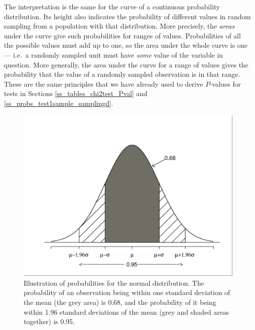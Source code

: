 The interpretation is the same for the curve of a continuous probability
distribution. Its height also indicates the probability of
different values in random sampling from a population
with that distribution. More precisely, the \emph{areas} under the curve
give such probabilities for ranges of values. Probabilities of all the
possible values must add up to one, so the area under the whole
curve is one --- i.e.\ a randomly sampled unit must have \emph{some}
value of the variable in question. More generally, the area under the
curve for a range of values gives the probability that the value of a
randomly sampled observation is in that range. These are the same
principles that we have already used to derive $P$-values for tests in
Sections \ref{ss_tables_chi2test_Pval} and
\ref{ss_probs_test1sample_samplingd}.

\begin{figure}[t]
\caption{Illustration of probabilities for the normal distribution.
The probability of an observation being within one standard deviation of
the mean (the grey area) is 0.68, and the probability of it being within
1.96 standard deviations of the mean (grey and shaded areas together) is
0.95.}
\label{f_norm1}
\begin{center}
\includegraphics[width=12cm]{norm1}
\end{center}

\end{figure}

